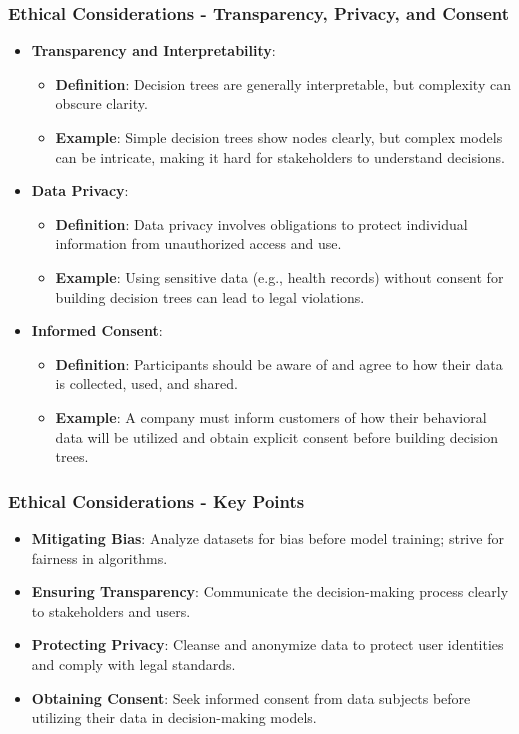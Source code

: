 \documentclass[aspectratio=169]{beamer}
\begin{document}
\begin{frame}[fragile]
    \frametitle{Ethical Considerations - Transparency, Privacy, and Consent}
    \begin{itemize}
        \item \textbf{Transparency and Interpretability}:
        \begin{itemize}
            \item \textbf{Definition}: Decision trees are generally interpretable, but complexity can obscure clarity.
            \item \textbf{Example}: Simple decision trees show nodes clearly, but complex models can be intricate, making it hard for stakeholders to understand decisions.
        \end{itemize}

        \item \textbf{Data Privacy}:
        \begin{itemize}
            \item \textbf{Definition}: Data privacy involves obligations to protect individual information from unauthorized access and use.
            \item \textbf{Example}: Using sensitive data (e.g., health records) without consent for building decision trees can lead to legal violations.
        \end{itemize}

        \item \textbf{Informed Consent}:
        \begin{itemize}
            \item \textbf{Definition}: Participants should be aware of and agree to how their data is collected, used, and shared.
            \item \textbf{Example}: A company must inform customers of how their behavioral data will be utilized and obtain explicit consent before building decision trees.
        \end{itemize}
    \end{itemize}
\end{frame}

\begin{frame}[fragile]
    \frametitle{Ethical Considerations - Key Points}
    \begin{itemize}
        \item \textbf{Mitigating Bias}: Analyze datasets for bias before model training; strive for fairness in algorithms.
        \item \textbf{Ensuring Transparency}: Communicate the decision-making process clearly to stakeholders and users.
        \item \textbf{Protecting Privacy}: Cleanse and anonymize data to protect user identities and comply with legal standards.
        \item \textbf{Obtaining Consent}: Seek informed consent from data subjects before utilizing their data in decision-making models.
    \end{itemize}
\end{frame}
\end{document}
